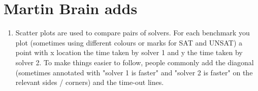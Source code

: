 \documentclass{article}
\begin{document}
\section{Martin Brain adds}
\begin{enumerate}
\item
Scatter plots are used to compare pairs of solvers.  For each benchmark you plot (sometimes using different colours or marks for SAT and UNSAT) a point with x location the time taken by solver 1 and y the time taken by solver 2.  To make things easier to follow, people commonly add the diagonal (sometimes annotated with "solver 1 is faster"
and "solver 2 is faster" on the relevant sides / corners) and the time-out lines.
\end{enumerate}

\end{document}
